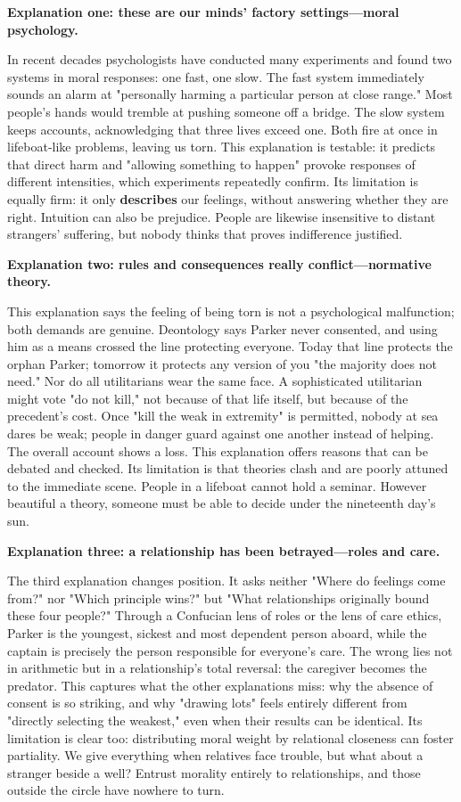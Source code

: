 \textbf{Explanation one: these are our minds' factory settings---moral psychology.}

In recent decades psychologists have conducted many experiments and found two systems in moral responses: one fast, one slow. The fast system immediately sounds an alarm at "personally harming a particular person at close range." Most people's hands would tremble at pushing someone off a bridge. The slow system keeps accounts, acknowledging that three lives exceed one. Both fire at once in lifeboat-like problems, leaving us torn. This explanation is testable: it predicts that direct harm and "allowing something to happen" provoke responses of different intensities, which experiments repeatedly confirm. Its limitation is equally firm: it only \textbf{describes} our feelings, without answering whether they are right. Intuition can also be prejudice. People are likewise insensitive to distant strangers' suffering, but nobody thinks that proves indifference justified.

\textbf{Explanation two: rules and consequences really conflict---normative theory.}

This explanation says the feeling of being torn is not a psychological malfunction; both demands are genuine. Deontology says Parker never consented, and using him as a means crossed the line protecting everyone. Today that line protects the orphan Parker; tomorrow it protects any version of you "the majority does not need." Nor do all utilitarians wear the same face. A sophisticated utilitarian might vote "do not kill," not because of that life itself, but because of the precedent's cost. Once "kill the weak in extremity" is permitted, nobody at sea dares be weak; people in danger guard against one another instead of helping. The overall account shows a loss. This explanation offers reasons that can be debated and checked. Its limitation is that theories clash and are poorly attuned to the immediate scene. People in a lifeboat cannot hold a seminar. However beautiful a theory, someone must be able to decide under the nineteenth day's sun.

\textbf{Explanation three: a relationship has been betrayed---roles and care.}

The third explanation changes position. It asks neither "Where do feelings come from?" nor "Which principle wins?" but "What relationships originally bound these four people?" Through a Confucian lens of roles or the lens of care ethics, Parker is the youngest, sickest and most dependent person aboard, while the captain is precisely the person responsible for everyone's care. The wrong lies not in arithmetic but in a relationship's total reversal: the caregiver becomes the predator. This captures what the other explanations miss: why the absence of consent is so striking, and why "drawing lots" feels entirely different from "directly selecting the weakest," even when their results can be identical. Its limitation is clear too: distributing moral weight by relational closeness can foster partiality. We give everything when relatives face trouble, but what about a stranger beside a well? Entrust morality entirely to relationships, and those outside the circle have nowhere to turn.

